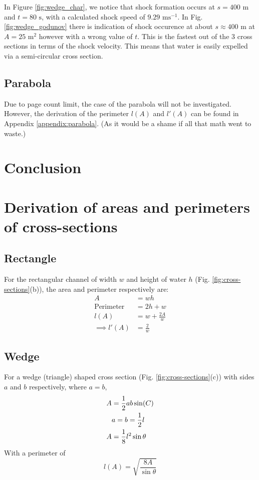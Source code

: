 \documentclass[12pt]{article}
\begin{document}
In Figure \ref{fig:wedge_char}, we notice that shock formation occurs at $s= 400\text{ m}$ and $t= 80\text{ s}$, with a calculated shock speed of $ 9.29\text{ ms}^{-1}$. In Fig. \ref{fig:wedge_godunov} there is indication of shock occurence at about $s\approx 400\text{ m}$ at $A = 25 \text{ m}^2$ however with a wrong value of $t$. This is the fastest out of the 3 cross sections in terms of the shock velocity. This means that water is easily expelled via a semi-circular cross section.

\subsection{Parabola}
Due to page count limit, the case of the parabola will not be investigated. However, the derivation of the perimeter $l(A)$ and $l'(A)$ can be found in Appendix \ref{appendix:parabola}. (As it would be a shame if all that math went to waste.)
\section{Conclusion}
\newpage



\newpage
\appendix
\section{Derivation of areas and perimeters of cross-sections}
\subsection{Rectangle}
\label{appendix:rectangle}
For the rectangular channel of width $w$ and height of water $h$ (Fig. \ref{fig:cross-sections}(b)), the area and perimeter respectively are:
\begin{equation}
    \begin{split}
        A &= wh
        \\\text{Perimeter}&=2h + w
        \\l(A) &= w + \frac{2A}{w}
        \\\implies l'(A) &= \frac{2}{w}
    \end{split}
\end{equation}

\subsection{Wedge}
\label{appendix:wedge}
For a wedge (triangle) shaped cross section (Fig. \ref{fig:cross-sections}(c)) with sides $a$ and $b$ respectively, where $a = b$,
\begin{align}
    A &= \frac{1}{2}ab\sin(C) \notag
    \\&a = b = \frac{1}{2}l \notag
    \\A &= \frac{1}{8}l^2\sin{\theta}
\end{align}
With a perimeter of 
\begin{equation}
    l(A) = \sqrt{\frac{8A}{\sin{\theta}}}
\end{equation}
\end{document}
